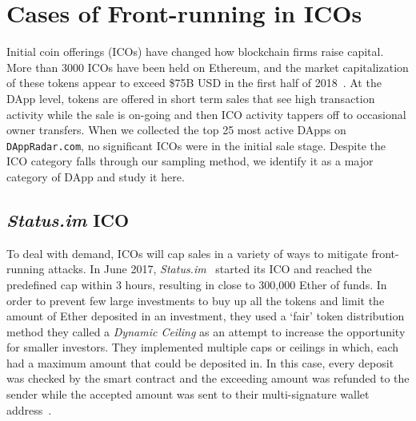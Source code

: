 

\section{Cases of Front-running in ICOs}  \label{sec:ICOsfrontrunning}

Initial coin offerings (ICOs) have changed how blockchain firms raise capital. More than 3000 ICOs have been held on Ethereum, and the market capitalization of these tokens appear to exceed \$75B USD in the first half of 2018~\cite{zetzsche2018ico}. At the DApp level, tokens are offered in short term sales that see high transaction activity while the sale is on-going and then ICO activity tappers off to occasional owner transfers. When we collected the top 25 most active DApps on \texttt{DAppRadar.com}, no significant ICOs were in the initial sale stage. Despite the ICO category falls through our sampling method, we identify it as a major category of DApp and study it here. 




\subsection{\textit{Status.im} ICO}
To deal with demand, ICOs will cap sales in a variety of ways to mitigate front-running attacks. In June 2017, \textit{Status.im}~\cite{statuswhitepaper} started its ICO and reached the predefined cap within 3 hours, resulting in close to 300,000 Ether of funds. In order to prevent few large investments to buy up all the tokens and limit the amount of Ether deposited in an investment, they used a `fair' token distribution method they called a \textit{Dynamic Ceiling} as an attempt to increase the opportunity for smaller investors. They implemented multiple caps or ceilings in which, each had a maximum amount that could be deposited in. In this case, every deposit was checked by the smart contract and the exceeding amount was refunded to the sender while the accepted amount was sent to their multi-signature wallet address~\cite{statusicoanalysis}. 

